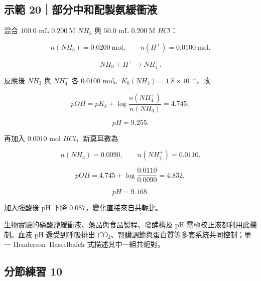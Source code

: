 \documentclass[11pt,a4paper]{article}
\begin{document}
\begin{HandoutWorkedExample}

\subsection{示範 20｜部分中和配製氨緩衝液}\label{ux793aux7bc4-20ux90e8ux5206ux4e2dux548cux914dux88fdux6c28ux7de9ux885dux6db2}

混合 \(100.0\) mL \(0.200\ \mathrm M\) \(NH_3\) 與
\(50.0\) mL \(0.200\ \mathrm M\) \(HCl\)：

\[
n(NH_3)=0.0200\ \mathrm{mol},\qquad n(H^+)=0.0100\ \mathrm{mol}.
\]

\[
NH_3+H^+\rightarrow NH_4^+.
\]

反應後 \(NH_3\) 與 \(NH_4^+\) 各 \(0.0100\) mol。\(K_b(NH_3)=1.8\times10^{-5}\)，故

\[
pOH=pK_b+\log\frac{n(NH_4^+)}{n(NH_3)}
=4.745,
\]

\[
pH=9.255.
\]

再加入 \(0.0010\) mol \(HCl\)，新莫耳數為

\[
n(NH_3)=0.0090,\qquad n(NH_4^+)=0.0110.
\]

\[
pOH=4.745+\log\frac{0.0110}{0.0090}=4.832,
\]

\[
pH=9.168.
\]

加入強酸後 pH 下降 \(0.087\)，變化直接來自共軛比。

\end{HandoutWorkedExample}

生物實驗的磷酸鹽緩衝液、藥品與食品製程、發酵槽及 pH 電極校正液都利用此機制。血液 pH 還受到呼吸排出 \(CO_2\)、腎臟調節與蛋白質等多套系統共同控制；單一 Henderson--Hasselbalch 式描述其中一組共軛對。

\subsection{分節練習 10}\label{ux5206ux7bc0ux7df4ux7fd2-10}
\end{document}
